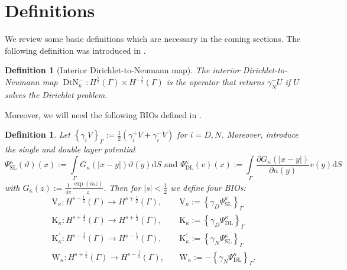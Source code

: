 \documentclass[12pt,journal,compsoc, onecolumn]{IEEEtran}
\newtheorem{definition}[theorem]{Definition}
\begin{document}
\section{Definitions}
\label{section:definitions}
We review some basic definitions which are necessary in the coming sections.
The following definition was introduced in \cite{meury2007stable}.
\begin{definition}[Interior Dirichlet-to-Neumann map]
    The interior Dirichlet-to-Neumann map  \(\operatorname{DtN}_{\kappa}^{-}: H^{\frac{1}{2}}(\Gamma) \times H^{-\frac{1}{2}}(\Gamma)\) is the operator that returns $\gamma^-_NU$ if $U$ solves the Dirichlet problem. 
\end{definition}
\noindent
Moreover, we will need the following BIOs defined in \cite{costabel1988boundary} \cite{meury2007stable}.
\begin{definition}
Let \(\left\{\gamma_{i} V\right\}_{\Gamma}:=\frac{1}{2}\left(\gamma_{i}^{+} V+\gamma_{i}^{-} V\right)\) for $i = D, N$. Moreover, introduce the single and double layer potential $$\Psi_{\mathrm{SL}}^{\kappa}(\vartheta)({x}):=\int\limits_{\Gamma} G_{\kappa}(|{x}-{y}|) \vartheta({y}) \mathrm{d} S \text{ and }  \Psi_{\mathrm{DL}}^{\kappa}(v)({x}):=\int\limits_{\Gamma} \frac{\partial G_{\kappa}(|{x}-{y}|)}{\partial {n}({y})} v({y}) \mathrm{d} S$$ with \(G_{\kappa}(z):=\frac{1}{4 \pi} \frac{\exp (i \kappa z)}{z}\). 
Then for $|s| < \frac{1}{2}$ we define four BIOs:
\begin{align} 
\mathrm{V}_{\kappa}: H^{s-\frac{1}{2}}(\Gamma) \rightarrow H^{s+\frac{1}{2}}(\Gamma), & \quad \mathrm{V}_{\kappa}:=\left\{\gamma_{D} \Psi_{\mathrm{SL}}^{\kappa}\right\}_{\Gamma} \nonumber\\ \mathrm{K}_{\kappa}: H^{s+\frac{1}{2}}(\Gamma) \rightarrow H^{s+\frac{1}{2}}(\Gamma), & \quad \mathrm{K}_{\kappa}:=\left\{\gamma_{D} \Psi_{\mathrm{DL}}^{\kappa}\right\}_{\Gamma} \nonumber \\ \mathrm{K}_{\kappa}^{\prime}: H^{s-\frac{1}{2}}(\Gamma) \rightarrow H^{s-\frac{1}{2}}(\Gamma), & \quad \mathrm{K}_{\kappa}^{\prime}:=\left\{\gamma_{N} \Psi_{\mathrm{SL}}^{\kappa}\right\}_{\Gamma} \nonumber\\ \mathrm{W}_{\kappa}: H^{s+\frac{1}{2}}(\Gamma) \rightarrow H^{s-\frac{1}{2}}(\Gamma), & \quad \mathrm{W}_{\kappa}:=-\left\{\gamma_{N} \Psi_{\mathrm{DL}}^{\kappa}\right\}_{\Gamma}. \nonumber
\end{align}
\end{definition} 
\noindent
\end{document}
